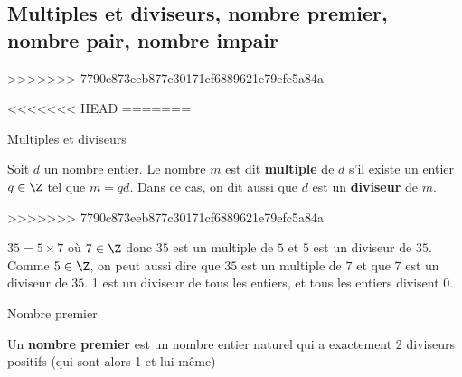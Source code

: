 \begin{pageCours}
\section{Multiples et diviseurs, nombre premier, nombre pair, nombre impair}
>>>>>>> 7790c873eeb877c30171cf6889621e79efc5a84a

 

<<<<<<< HEAD
%
%
=======
\begin{DefT}{Multiples et diviseurs}

Soit $d$ un nombre entier. Le nombre $m$ est dit \textbf{multiple} de $d$ s'il existe un entier $q \in \Z$ tel que $m=qd$. Dans ce cas, on dit aussi que $d$ est un \textbf{diviseur} de $m$.
\end{DefT}

>>>>>>> 7790c873eeb877c30171cf6889621e79efc5a84a

\begin{Exs} 
  $35=5 \times 7$ où $7 \in \Z$ donc $35$ est un multiple de $5$
  et $5$ est un diviseur de $35$. Comme $5 \in \Z$, on peut aussi
  dire que $35$ est un multiple de $7$ et que $7$ est un diviseur de
  $35$.
  1 est un diviseur de tous les entiers, et tous les entiers
  divisent 0.
\end{Exs}


 

\begin{DefT}{Nombre premier}

Un \textbf{nombre premier} est un nombre entier naturel qui a exactement 2 diviseurs positifs (qui sont alors 1 et lui-même) 

\end{DefT}


\begin{Ex} 


\end{Ex}
\end{pageCours}
